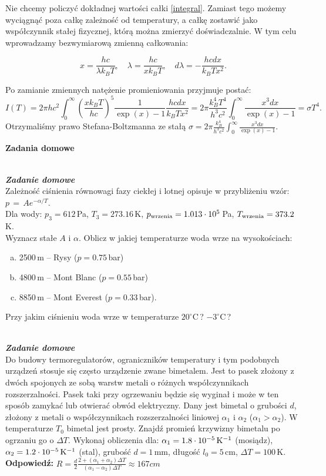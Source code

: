 \documentclass[11pt,a4paper]{article}
\newcounter{zaddom}\newcommand{\zaddom}[1][]{\addtocounter{zaddom}{1} ~\\  {\bf \emph{Zadanie domowe \arabic{zaddom} #1 }} \\}
\begin{document}
Nie chcemy policzyć dokładnej wartości całki \eqref{integral}. Zamiast tego możemy wyciągnąć poza
całkę zależność od temperatury, a całkę zostawić jako współczynnik stałej fizycznej, którą można
zmierzyć doświadczalnie. W tym celu wprowadzamy bezwymiarową zmienną całkowania:

\begin{equation}
x = \frac{h c}{\lambda k_B T}, \quad \lambda = \frac{h c}{x k_B T},\quad d\lambda = - \frac{h c dx}{k_B T x^2}.
\end{equation}

Po zamianie zmiennych natężenie promieniowania przyjmuje postać:
\begin{equation}
  I(T) = 2 \pi h c^2 \int_0^\infty \left(\frac{xk_B T}{hc}\right)^5 \frac{1}{\exp(x)-1}
  \frac{h c dx}{k_B T x^2} =
  2 \pi \frac{k_B^4 T^4}{h^3 c^2} \int_0^\infty \frac{x^3 dx}{\exp(x)-1} = \sigma T^4.
\end{equation}
Otrzymaliśmy prawo Stefana-Boltzmanna ze stałą $\sigma = 2 \pi \frac{k_B^4}{ h^3 c^2} \int_0^\infty \frac{x^3 dx}{\exp(x)-1}$.

\pagebreak
\begin{centering}
\bf{ Zadania domowe }\\[1mm]
\end{centering}
\vspace{1mm}

\zaddom
Zależność ciśnienia równowagi fazy ciekłej i lotnej opisuje 
w przybliżeniu wzór: $ p \,=\, A e^{-\alpha /T} $.\\
Dla wody: $p_3 = 612\,$Pa, $T_3 = 273.16\,$K, 
$p_{\rm wrzenia} = 1.013\cdot 10^5\,$Pa, 
$T_{\rm wrzenia} = 373.2\,$K.\\ 
Wyznacz stałe $A$ i $\alpha$.
Oblicz w jakiej temperaturze woda wrze na wysokościach:
\begin{enumerate}[a)] 
\item 2500\,m -- Rysy ($p = 0.75\,$bar)
\item 4800\,m -- Mont Blanc ($p = 0.55\,$bar)
\item 8850\,m -- Mont Everest ($p = 0.33\,$bar).
\end{enumerate}
Przy jakim ciśnieniu woda wrze w temperaturze $20^\circ$C\,? $-3^\circ$C\,?
\vskip 10pt


\zaddom
Do budowy termoregulatorów, ograniczników temperatury i tym
podobnych urządzeń stosuje się często urządzenie zwane bimetalem.
Jest to pasek złożony z dwóch spojonych ze sobą warstw metali
o różnych współczynnikach rozszerzalności.
Pasek taki przy ogrzewaniu będzie się wyginał i może
w ten sposób zamykać lub otwierać obwód elektryczny.
Dany jest bimetal o grubości $d$, złożony z metali
o współczynnikach rozszerzalności liniowej $\alpha_1$ i $\alpha_2$
($\alpha_1 > \alpha_2$).
W temperaturze $T_0$ bimetal jest prosty.
Znajdź promień krzywizny bimetalu po ogrzaniu go o $\Delta T$.
Wykonaj obliczenia dla: $\alpha_1=1.8\cdot 10^{-5}\,{\rm K}^{-1}$ (mosiądz),
$\alpha_2=1.2\cdot 10^{-5}\,{\rm K}^{-1}$ (stal), grubość $d=1\,$mm,
długość $l_0=5\,$cm, $\Delta T=100\,$K.
\vskip 10pt
\textbf{Odpowiedź:}
$R = \frac{d}{2} \frac{2+(\alpha_1+\alpha_2)\Delta T}{(\alpha_1-\alpha_2)\Delta T} \approx 167 cm$
\end{document}

